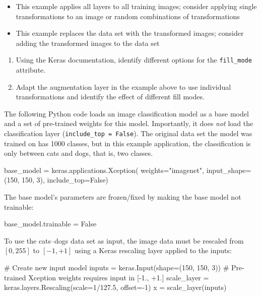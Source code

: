 \begin{withcode}
\begin{infobox}
\begin{itemize}
   \item This example applies all layers to all training images; consider applying single transformations to an image or random combinations of transformations
   \item This example replaces the data set with the transformed images; consider adding the transformed images to the data set
\end{itemize}
\end{infobox}


\begin{exerciseboxcomputer}
\begin{enumerate}
  \item Using the Keras documentation, identify different options for the \texttt{fill\_mode} attribute.
  \item Adapt the augmentation layer in the example above to use individual transformations and identify the effect of different fill modes.
\end{enumerate}
\end{exerciseboxcomputer}


The following Python code loads an image classification model as a base model and a set of pre-trained weights for this model. Importantly, it does \emph{not} load the classification layer (\small\texttt{include\_top = False}\normalsize). The original data set the model was trained on has 1000 classes, but in this example application, the classification is only between cats and dogs, that is, two classes.
 
\begin{pythoncode}
base_model = keras.applications.Xception(
    weights="imagenet",
    input_shape=(150, 150, 3),
    include_top=False)
\end{pythoncode}

The base model's parameters are frozen/fixed by making the base model not trainable:
\begin{pythoncode}
base_model.trainable = False
\end{pythoncode}

To use the cats--dogs data set as input, the image data must be rescaled from $[0, 255]$ to $[-1, +1]$ using a Keras rescaling layer applied to the inputs:
\begin{pythoncode}
# Create new input model
inputs = keras.Input(shape=(150, 150, 3))
# Pre-trained Xception weights requires input in [-1., +1.]
scale_layer = keras.layers.Rescaling(scale=1/127.5, offset=-1)
x = scale_layer(inputs)
\end{pythoncode}


\end{withcode}
